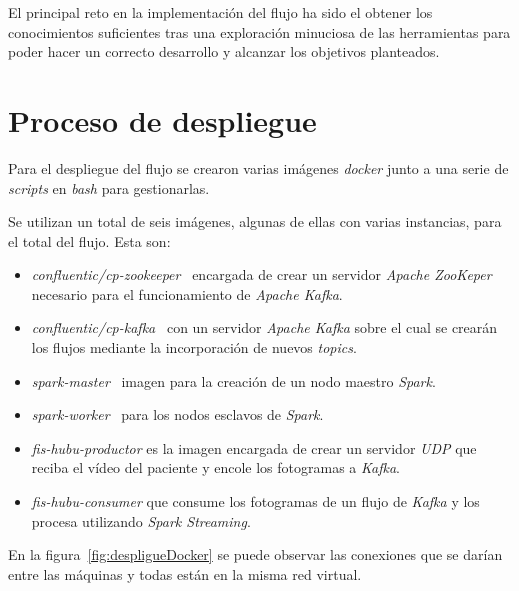 El principal reto en la implementación del flujo ha sido el obtener los conocimientos suficientes tras una exploración minuciosa de las herramientas para poder hacer un correcto desarrollo y alcanzar los objetivos planteados.


\section{Proceso de despliegue}

Para el despliegue del flujo se crearon varias imágenes \textit{docker} junto a una serie de \textit{scripts} en \textit{bash} para gestionarlas.

Se utilizan un total de seis imágenes, algunas de ellas con varias instancias, para el total del flujo. Esta son:

\begin{itemize}
	\item \textit{confluentic/cp-zookeeper}~\cite{confluentic2020docker} encargada de crear un servidor \textit{Apache ZooKeper} necesario para el funcionamiento de \textit{Apache Kafka}.
	\item \textit{confluentic/cp-kafka}~\cite{confluentic2020docker} con un servidor \textit{Apache Kafka} sobre el cual se crearán los flujos mediante la incorporación de nuevos \textit{topics}.
	\item \textit{spark-master}~\cite{juez2019docker} imagen para la creación de un nodo maestro \textit{Spark}.
	\item \textit{spark-worker}~\cite{juez2019docker} para los nodos esclavos de \textit{Spark}.
	\item \textit{fis-hubu-productor} es la imagen encargada de crear un servidor \textit{UDP} que reciba el vídeo del paciente y encole los fotogramas a \textit{Kafka}.
	\item \textit{fis-hubu-consumer} que consume los fotogramas de un flujo de \textit{Kafka} y los procesa utilizando \textit{Spark Streaming}.
\end{itemize}

En la figura~\ref{fig:despligueDocker} se puede observar las conexiones que se darían entre las máquinas y todas están en la misma red virtual.

